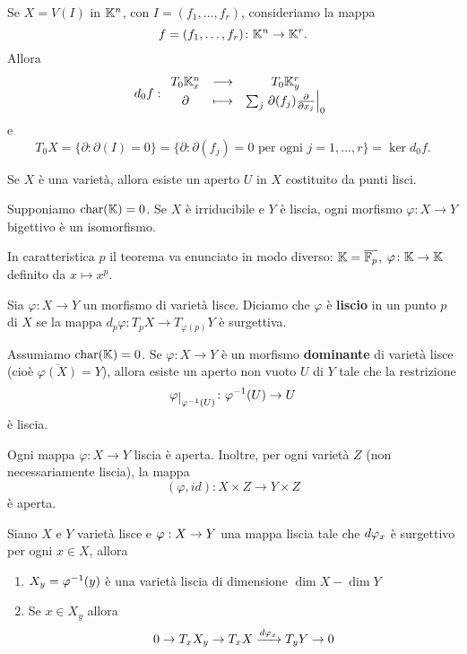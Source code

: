 \begin{example}
    Se $X=V(I)$ in $\mathbb{K}^n$, con $I=(f_1,\ldots,f_r)$, consideriamo la mappa \[f=(f_1,\ldots,f_r)\colon \mathbb{K}^n \to \mathbb{K}^r.\] Allora 
    \[d_0f:\begin{array}{ccc} {T_0 \mathbb{K}^n_x} & \longrightarrow & {T_0 \mathbb{K}^r_y}\\ {\partial} & \longmapsto & {\sum_j \left.\partial(f_j)\frac{\partial}{\partial x_j}\right\lvert_0} \end{array}\]
    e \[T_0 X=\{\partial\colon \partial(I)=0\}=\{\partial\colon \partial(f_j)=0 \text{ per ogni }j=1,\ldots,r\}=\ker d_0f.\]
\end{example}

\begin{theorem}
    Se $X$ è una varietà, allora esiste un aperto $U$ in $X$ costituito da punti lisci.
\end{theorem}



\begin{theorem}[Zariski]\label{ThZariski}
Supponiamo $\operatorname{char}(\mathbb{K})=0$. Se $X$ \`e irriducibile e $Y$ \`e liscia, ogni morfismo $\varphi\colon X\to Y$ bigettivo è un isomorfismo.    
\end{theorem}

In caratteristica $p$ il teorema va enunciato in modo diverso: $\mathbb{K}=\overline{\mathbb{F}_p}$, $\varphi\colon \mathbb{K} \to \mathbb{K}$ definito da $x\mapsto x^p$.


\begin{definition}
    Sia $\varphi\colon X\to Y$ un morfismo di varietà lisce. Diciamo che $\varphi$ è \textbf{liscio} in un punto $p$ di $X$ se la mappa $d_p\varphi\colon T_pX\to T_{\varphi(p)}Y$ è surgettiva.
\end{definition}

\begin{theorem}\label{ThMorfismoDominanteTraLisceHaRestrizioneLisciaSuAperto}
    Assumiamo $\operatorname{char}(\mathbb{K})=0$. Se $\varphi\colon X\to Y$ è un morfismo \textbf{dominante} di varietà lisce (cioè $\overline{\varphi(X)}=Y$), allora esiste un aperto non vuoto $U$ di $Y$ tale che la restrizione \[\varphi\res{\varphi^{-1}(U)}\colon \varphi^{-1}(U) \to U\] è liscia.
\end{theorem}

\begin{theorem}\label{ThMappaLisciaEAperta}
    Ogni mappa $\varphi\colon X \to Y$ liscia è aperta. Inoltre, per ogni varietà $Z$ (non necessariamente liscia), la mappa \[(\varphi,id)\colon X\times Z \to Y\times Z\] è aperta.
\end{theorem}


\begin{theorem}\label{ThFibrePerMappeLiscie}
Siano $X$ e $Y$ variet\`a lisce e $\varphi:X\to Y$ una mappa liscia tale che $d\varphi_x$ \`e surgettivo per ogni $x\in X$, allora
\begin{enumerate}
	\item $X_y=\varphi^{-1}(y)$ \`e una variet\`a liscia di dimensione $\dim X-\dim Y$
	\item Se $x\in X_y$ allora
	\[0\to T_x X_y\to T_x X\xrightarrow{d\varphi_x} T_y Y\to 0\]
\end{enumerate}
\end{theorem}